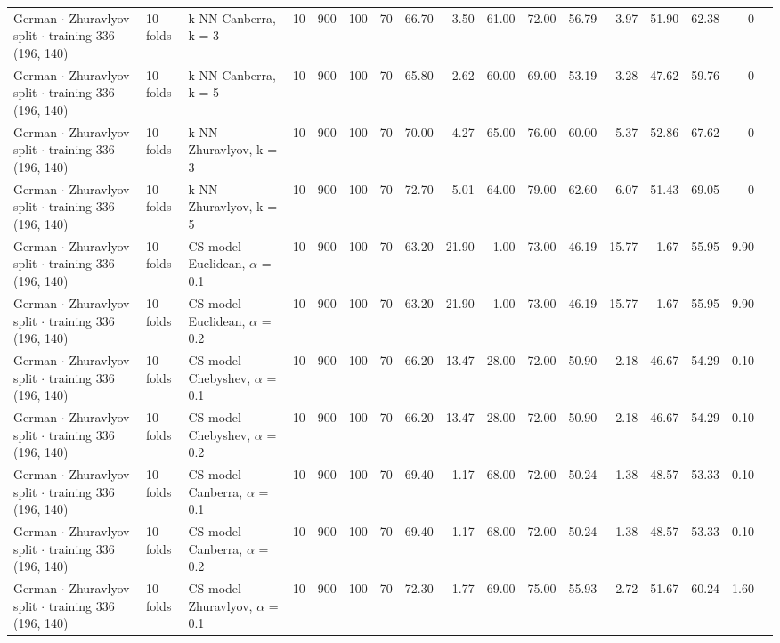 \begin{longtable}{lllrrrrrrrrrrrrrl}
  German $\cdot$ Zhuravlyov split $\cdot$ training 336 (196, 140) & 10 folds & k-NN Canberra, k = 3 & 10 & 900 & 100 & 70 & 66.70 & 3.50 & 61.00 & 72.00 & 56.79 & 3.97 & 51.90 & 62.38 & 0 &  \\
  German $\cdot$ Zhuravlyov split $\cdot$ training 336 (196, 140) & 10 folds & k-NN Canberra, k = 5 & 10 & 900 & 100 & 70 & 65.80 & 2.62 & 60.00 & 69.00 & 53.19 & 3.28 & 47.62 & 59.76 & 0 &  \\
  German $\cdot$ Zhuravlyov split $\cdot$ training 336 (196, 140) & 10 folds & k-NN Zhuravlyov, k = 3 & 10 & 900 & 100 & 70 & 70.00 & 4.27 & 65.00 & 76.00 & 60.00 & 5.37 & 52.86 & 67.62 & 0 &  \\
  German $\cdot$ Zhuravlyov split $\cdot$ training 336 (196, 140) & 10 folds & k-NN Zhuravlyov, k = 5 & 10 & 900 & 100 & 70 & 72.70 & 5.01 & 64.00 & 79.00 & 62.60 & 6.07 & 51.43 & 69.05 & 0 &  \\
  German $\cdot$ Zhuravlyov split $\cdot$ training 336 (196, 140) & 10 folds & CS-model Euclidean, $\alpha$ = 0.1 & 10 & 900 & 100 & 70 & 63.20 & 21.90 & 1.00 & 73.00 & 46.19 & 15.77 & 1.67 & 55.95 & 9.90 &  \\
  German $\cdot$ Zhuravlyov split $\cdot$ training 336 (196, 140) & 10 folds & CS-model Euclidean, $\alpha$ = 0.2 & 10 & 900 & 100 & 70 & 63.20 & 21.90 & 1.00 & 73.00 & 46.19 & 15.77 & 1.67 & 55.95 & 9.90 &  \\
  German $\cdot$ Zhuravlyov split $\cdot$ training 336 (196, 140) & 10 folds & CS-model Chebyshev, $\alpha$ = 0.1 & 10 & 900 & 100 & 70 & 66.20 & 13.47 & 28.00 & 72.00 & 50.90 & 2.18 & 46.67 & 54.29 & 0.10 &  \\
  German $\cdot$ Zhuravlyov split $\cdot$ training 336 (196, 140) & 10 folds & CS-model Chebyshev, $\alpha$ = 0.2 & 10 & 900 & 100 & 70 & 66.20 & 13.47 & 28.00 & 72.00 & 50.90 & 2.18 & 46.67 & 54.29 & 0.10 &  \\
  German $\cdot$ Zhuravlyov split $\cdot$ training 336 (196, 140) & 10 folds & CS-model Canberra, $\alpha$ = 0.1 & 10 & 900 & 100 & 70 & 69.40 & 1.17 & 68.00 & 72.00 & 50.24 & 1.38 & 48.57 & 53.33 & 0.10 &  \\
  German $\cdot$ Zhuravlyov split $\cdot$ training 336 (196, 140) & 10 folds & CS-model Canberra, $\alpha$ = 0.2 & 10 & 900 & 100 & 70 & 69.40 & 1.17 & 68.00 & 72.00 & 50.24 & 1.38 & 48.57 & 53.33 & 0.10 &  \\
  German $\cdot$ Zhuravlyov split $\cdot$ training 336 (196, 140) & 10 folds & CS-model Zhuravlyov, $\alpha$ = 0.1 & 10 & 900 & 100 & 70 & 72.30 & 1.77 & 69.00 & 75.00 & 55.93 & 2.72 & 51.67 & 60.24 & 1.60 &  \\

\end{longtable}

